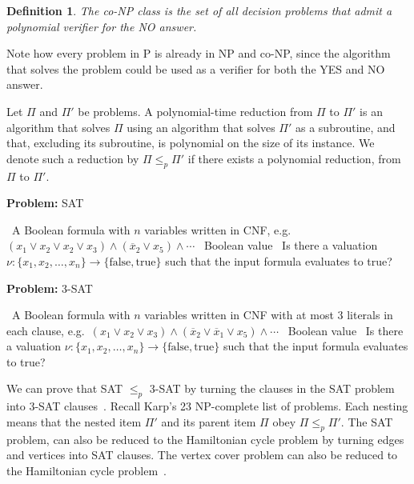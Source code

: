 \documentclass{amsart}
\newcommand{\ov}{\overline}
\theoremstyle{plain}
\newcounter{dummy-def}\numberwithin{dummy-def}{section}
\newtheorem{definition}[dummy-def]{Definition}
\newcounter{dummy-prop}\numberwithin{dummy-prop}{section}
\newcounter{dummy-corollary}\numberwithin{dummy-corollary}{section}
\newcounter{dummy-ex}\numberwithin{dummy-ex}{section}
\newcounter{dummy-eg}\numberwithin{dummy-eg}{section}
\newcommand{\true}{\text{true}}
\newcommand{\false}{\text{false}}
\begin{document}
\begin{definition} The co-NP class is the set of all decision problems that admit a
  polynomial verifier for the NO answer.
\end{definition}

Note how every problem in P is already in NP and co-NP, since the algorithm that solves the problem
could be used as a verifier for both the YES and NO answer.

Let $\Pi$ and $\Pi'$ be problems. A polynomial-time reduction from $\Pi$ to $\Pi'$ is an algorithm
that solves $\Pi$ using an algorithm that solves $\Pi'$ as a subroutine, and that, excluding its
subroutine, is polynomial on the size of its instance. We denote such a reduction by
$\Pi\leq_p\Pi'$ if there exists a polynomial reduction, from $\Pi$ to $\Pi'$.

\begin{algorithm}[h]
  \caption*{\textbf{Problem:} SAT}
  \begin{algorithmic}[1]
    \Require\, A Boolean formula with $n$ variables written in CNF, e.g.\ $(x_1\vee x_2\vee x_2\vee
    x_3)\wedge (\ov{x}_2\vee x_5)\wedge\cdots$
    \Ensure\, Boolean value
    \Description\, Is there a valuation $\nu :\{x_1,x_2,\ldots,x_n\}\to\{\false, \true\}$ such that the
    input formula evaluates to true?
  \end{algorithmic}
\end{algorithm}

\begin{algorithm}[h]
  \caption*{\textbf{Problem:} 3-SAT}
  \begin{algorithmic}[1]
    \Require\, A Boolean formula with $n$ variables written in CNF with at most 3 literals in each
    clause, e.g.\ $(x_1\vee x_2\vee x_3)\wedge(\ov{x}_2\vee\ov{x}_1\vee x_5) \wedge\cdots$
    \Ensure\, Boolean value
    \Description\, Is there a valuation $\nu :\{x_1,x_2,\ldots,x_n\}\to\{\false, \true\}$ such that the
    input formula evaluates to true?
  \end{algorithmic}
\end{algorithm}

We can prove that SAT $\leq_p$ 3-SAT by turning the clauses in the SAT problem into 3-SAT
clauses~\cite{karp}. Recall Karp's 23 NP-complete list of problems. Each nesting means that the
nested item $\Pi'$ and its parent item $\Pi$ obey $\Pi\leq_p\Pi'$. The SAT problem, can also be
reduced to the Hamiltonian cycle problem by turning edges and vertices into SAT clauses. The vertex
cover problem can also be reduced to the Hamiltonian cycle problem~\cite{karp}.
\end{document}
